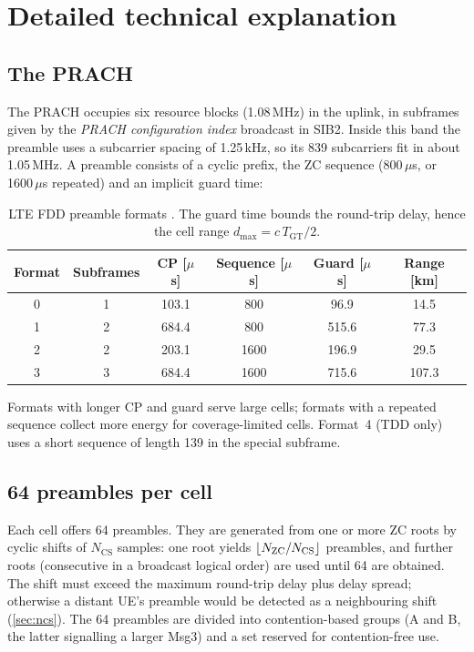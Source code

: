 \documentclass[11pt,a4paper]{article}
\begin{document}
\section{Detailed technical explanation}

\subsection{The PRACH}
The PRACH occupies six resource blocks (1.08\,MHz) in the uplink, in subframes given by the
\emph{PRACH configuration index} broadcast in SIB2. Inside this band the preamble uses a subcarrier
spacing of 1.25\,kHz, so its 839 subcarriers fit in about 1.05\,MHz. A preamble consists of a cyclic
prefix, the ZC sequence (800\,$\mu$s, or 1600\,$\mu$s repeated) and an implicit guard time:
\begin{table}[htbp]
\centering\small
\caption{LTE FDD preamble formats \cite{ts36211}. The guard time bounds the round-trip delay, hence the
cell range $d_{\max} = c\,T_{\mathrm{GT}}/2$.}\label{tab:formats}
\begin{tabular}{@{}cccccc@{}}
\toprule
\rowcolor{white}Format & Subframes & CP [$\mu$s] & Sequence [$\mu$s] & Guard [$\mu$s] & Range [km] \\
\midrule
0 & 1 & 103.1 & 800  & 96.9  & 14.5 \\
1 & 2 & 684.4 & 800  & 515.6 & 77.3 \\
2 & 2 & 203.1 & 1600 & 196.9 & 29.5 \\
3 & 3 & 684.4 & 1600 & 715.6 & 107.3 \\
\bottomrule
\end{tabular}
\end{table}
Formats with longer CP and guard serve large cells; formats with a repeated sequence collect more
energy for coverage-limited cells. Format~4 (TDD only) uses a short sequence of length 139 in the
special subframe.

\subsection{64 preambles per cell}
Each cell offers 64 preambles. They are generated from one or more ZC roots by cyclic shifts of
$N_{\mathrm{CS}}$ samples: one root yields $\left\lfloor N_{\mathrm{ZC}}/N_{\mathrm{CS}}\right\rfloor$ preambles, and further
roots (consecutive in a broadcast logical order) are used until 64 are obtained. The shift must
exceed the maximum round-trip delay plus delay spread; otherwise a distant UE's preamble would be
detected as a neighbouring shift (\cref{sec:ncs}). The 64 preambles are divided into contention-based
groups (A and B, the latter signalling a larger Msg3) and a set reserved for contention-free use.
\end{document}
